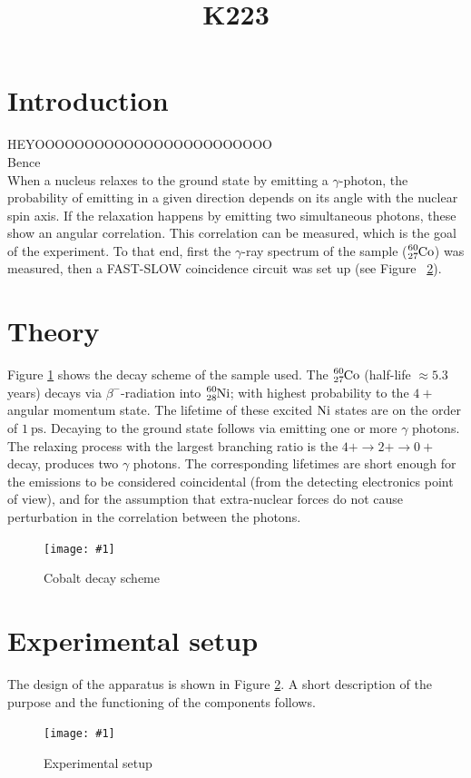 \documentclass[twocolumn]{article}
\title{K223}
\newcommand{\insertFigure}[1]{%
   \texttt{[image: \#1]}%
}
\begin{document}
\maketitle
\newpage
\section{Introduction}
HEYOOOOOOOOOOOOOOOOOOOOOOOO\\
Bence\\
When a nucleus relaxes to the ground state by emitting a $\gamma$-photon, the probability of emitting in a given direction depends on its angle with the nuclear spin axis. If the relaxation happens by emitting two simultaneous photons, these show an angular correlation. This correlation can be measured, which is the goal of the experiment. To that end, first the $\gamma$-ray spectrum of the sample ($\ce{_27^{60}Co}$) was measured, then a FAST-SLOW coincidence circuit was set up (see Figure ~\ref{fig:exp_setup}). 
\section{Theory}
Figure \ref{fig:cobalt_scheme} shows the decay scheme of the sample used. The $\ce{_27^{60}Co}$ (half-life $\approx 5.3$ years) decays via $\beta^-$-radiation into $\ce{_28^{60}Ni}$; with highest probability to the $4+$ angular momentum state. %
The lifetime of these excited $\ce{Ni}$ states are on the order of $\SI{1}{\pico\second}$. 
Decaying to the ground state follows via emitting one or more $\gamma$ photons. The relaxing process with the largest branching ratio is the $4+ \rightarrow 2+ \rightarrow 0+$ decay, produces two $\gamma$ photons. The corresponding lifetimes are short enough for the emissions to be considered coincidental (from the detecting electronics point of view), and for the assumption that extra-nuclear forces do not cause perturbation in the correlation between the photons.
\begin{figure}[!h]
\centering
\insertFigure{cobalt_scheme.png}
\caption{Cobalt decay scheme \cite{cobalt_scheme}}
\label{fig:cobalt_scheme}
\end{figure}
\section{Experimental setup}
The design of the apparatus is shown in Figure \ref{fig:exp_setup}. A short description of the purpose and the functioning of the components follows.
\begin{figure}[!h]
\centering
\insertFigure{k223_setup.png}
\caption{Experimental setup \cite{booklet}}
\label{fig:exp_setup}
\end{figure}
\end{document}
